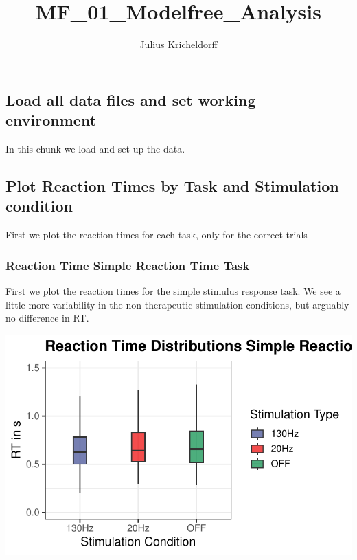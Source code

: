 \documentclass[
  letterpaper,
  DIV=11,
  numbers=noendperiod]{scrartcl}
\title{MF\_01\_Modelfree\_Analysis}
\author{Julius Kricheldorff}
\date{}
\begin{document}
\maketitle
\ifdefined\Shaded\renewenvironment{Shaded}{\begin{tcolorbox}[interior hidden, frame hidden, borderline west={3pt}{0pt}{shadecolor}, sharp corners, enhanced, breakable, boxrule=0pt]}{\end{tcolorbox}}\fi

\hypertarget{load-all-data-files-and-set-working-environment}{%
\subsection{Load all data files and set working
environment}\label{load-all-data-files-and-set-working-environment}}

In this chunk we load and set up the data.

\hypertarget{plot-reaction-times-by-task-and-stimulation-condition}{%
\subsection{Plot Reaction Times by Task and Stimulation
condition}\label{plot-reaction-times-by-task-and-stimulation-condition}}

First we plot the reaction times for each task, only for the correct
trials

\hypertarget{reaction-time-simple-reaction-time-task}{%
\subsubsection{Reaction Time Simple Reaction Time
Task}\label{reaction-time-simple-reaction-time-task}}

First we plot the reaction times for the simple stimulus response task.
We see a little more variability in the non-therapeutic stimulation
conditions, but arguably no difference in RT.

\includegraphics{MF_01_Modelfree_Analysis_files/figure-pdf/unnamed-chunk-2-1.pdf}
\end{document}
